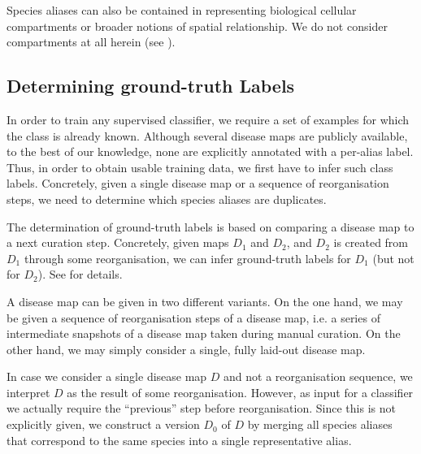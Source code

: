 \documentclass[
	fontsize=10pt, %
	twoside=false, %
	secnumdepth=1, %
  toc=indentunnumbered %
]{kaobook}
\begin{document}
Species aliases can also be contained in  representing
biological cellular compartments or broader notions of spatial relationship. We
do not consider compartments at all herein (see ).





\subsection{Determining ground-truth Labels}
\label{sec:determining-labels}

In order to train any supervised classifier, we require a set of examples for
which the class is already known. Although several disease maps are publicly
available, to the best of our knowledge, none are explicitly annotated with a
per-alias label. Thus, in order to obtain usable training data, we first have to
infer such class labels. Concretely, given a single disease map or a sequence of
reorganisation steps, we need to determine which species aliases are duplicates.

The determination of ground-truth labels is based on comparing a disease map to
a next curation step. Concretely, given maps $D_1$ and $D_2$, and $D_2$ is
created from $D_1$ through some reorganisation, we can infer ground-truth
labels for $D_1$ (but not for $D_2$). See  for details.

A disease map can be given in two different variants. On the one hand, we may be
given a sequence of reorganisation steps of a disease map, i.e. a series of intermediate
snapshots of a disease map taken during manual curation. On the other hand, we
may simply consider a single, fully laid-out disease map.

In case we consider a single disease map $D$ and not a reorganisation sequence,
we interpret $D$ as the result of some reorganisation. However, as input for a
classifier we actually require the ``previous'' step before reorganisation.
Since this is not explicitly given, we construct a  version $D_0$
of $D$ by merging all species aliases that correspond to the same species into a
single representative alias.
\end{document}
